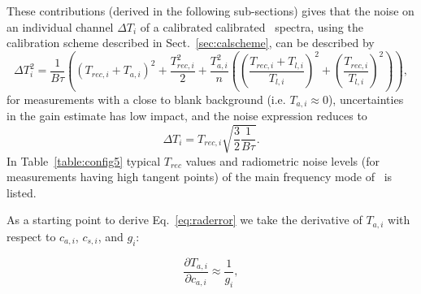 These contributions (derived in the following sub-sections) gives that the noise on an individual channel \(\Delta T_{i}\) of a 
calibrated calibrated \smr\ spectra, using the calibration scheme described in Sect.~\ref{sec:calscheme}, 
can be described by
\begin{equation}
\Delta T_{i}^{2} =  \frac{1}{B\tau} \left( (T_{rec,i}+T_{a,i})^2 + \frac{T_{rec,i}^2}{2} +
   \frac{T_{a,i}^{2}}{n} \left( \left( \frac{T_{rec,i} + T_{l,i}}{T_{l,i}} \right)^2 + 
   \left( \frac{T_{rec,i} }{T_{l,i}} \right)^2 \right) \right),
\label{eq:raderror}
\end{equation}
for measurements with a close to blank background (i.e. \(T_{a,i}\approx\)0), uncertainties in the gain estimate 
has low impact, and the noise expression reduces to
\begin{equation}
\Delta T_{i} =  T_{rec,i}\sqrt{\frac{3}{2}\frac{1}{B\tau}}.
\label{eq:higaltnoise}
\end{equation}
In Table~\ref{table:config5} typical \(T_{rec}\) values and radiometric noise levels
(for measurements having high tangent points)
of the main frequency mode of \smr\ is listed.



As a starting point to derive Eq.~\ref{eq:raderror} we take the derivative of \(T_{a,i}\) 
with respect to \(c_{a,i}\), \(c_{s,i}\), and \(g_{i}\):

\begin{equation}
\frac{\partial T_{a,i}}{\partial c_{a,i}} \approx \frac{1}{g_i}, 
\end{equation}

